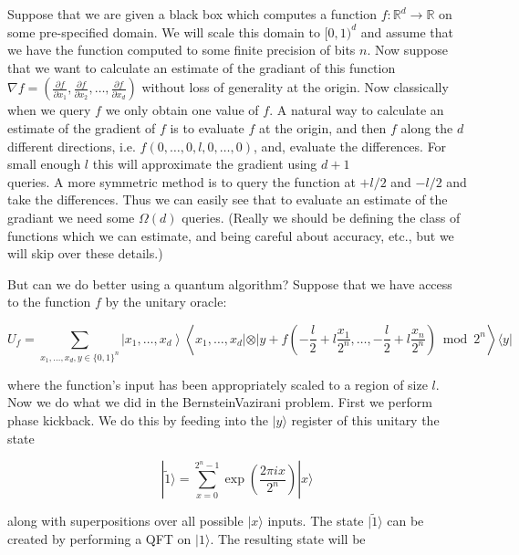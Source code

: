 \documentclass[10pt]{article}
\begin{document}
Suppose that we are given a black box which computes a function $f: \mathbb{R}^{d} \rightarrow \mathbb{R}$ on some pre-specified domain. We will scale this domain to $[0,1)^{d}$ and assume that we have the function computed to some finite precision of bits $n$. Now suppose that we want to calculate an estimate of the gradiant of this function $\nabla f=\left(\frac{\partial f}{\partial x_{1}}, \frac{\partial f}{\partial x_{2}}, \ldots, \frac{\partial f}{\partial x_{d}}\right)$ without loss of generality at the origin. Now classically when we query $f$ we only obtain one value of $f$. A natural way to calculate an estimate of the gradient of $f$ is to evaluate $f$ at the origin, and then $f$ along the $d$ different directions, i.e. $f(0, \ldots, 0, l, 0, \ldots, 0)$, and, evaluate the differences. For small enough $l$ this will approximate the gradient using $d+1$\\
queries. A more symmetric method is to query the function at $+l / 2$ and $-l / 2$ and take the differences. Thus we can easily see that to evaluate an estimate of the gradiant we need some $\Omega(d)$ queries. (Really we should be defining the class of functions which we can estimate, and being careful about accuracy, etc., but we will skip over these details.)

But can we do better using a quantum algorithm? Suppose that we have access to the function $f$ by the unitary oracle:


\begin{equation*}
U_{f}=\sum_{x_{1}, \ldots, x_{d}, y \in\{0,1\}^{n}}\left|x_{1}, \ldots, x_{d}\right\rangle\left\langle x_{1}, \ldots, x_{d}|\otimes| y+f\left(-\frac{l}{2}+l \frac{x_{1}}{2^{n}}, \ldots,-\frac{l}{2}+l \frac{x_{n}}{2^{n}}\right) \bmod 2^{n}\right\rangle\langle y| \tag{34}
\end{equation*}


where the function's input has been appropriately scaled to a region of size $l$. Now we do what we did in the BernsteinVazirani problem. First we perform phase kickback. We do this by feeding into the $|y\rangle$ register of this unitary the state


\begin{equation*}
|\tilde{1}\rangle=\sum_{x=0}^{2^{n}-1} \exp \left(\frac{2 \pi i x}{2^{n}}\right)|x\rangle \tag{35}
\end{equation*}


along with superpositions over all possible $|x\rangle$ inputs. The state $|\tilde{1}\rangle$ can be created by performing a QFT on $|1\rangle$. The resulting state will be
\end{document}
